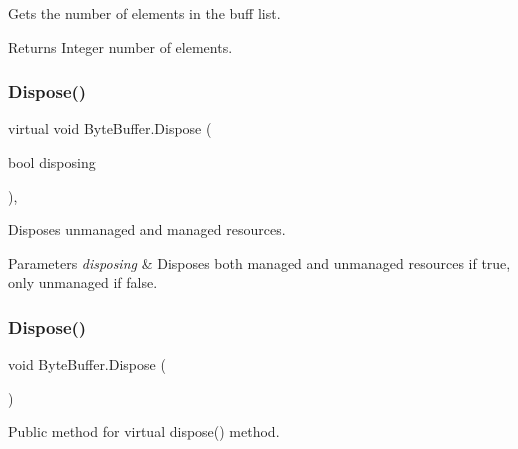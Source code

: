 Gets the number of elements in the buff list. 

\begin{DoxyReturn}{Returns}
Integer number of elements.
\end{DoxyReturn}
\mbox{\label{class_byte_buffer_aad8eb7dab24ee09d89f47c47f424e536}} 
\subsubsection{\texorpdfstring{Dispose()}{Dispose()}\hspace{0.1cm}{\footnotesize\ttfamily [1/2]}}
{\footnotesize\ttfamily virtual void Byte\+Buffer.\+Dispose (\begin{DoxyParamCaption}\item[{bool}]{disposing }\end{DoxyParamCaption})\hspace{0.3cm}{\ttfamily [protected]}, {\ttfamily [virtual]}}



Disposes unmanaged and managed resources. 


\begin{DoxyParams}{Parameters}
{\em disposing} & Disposes both managed and unmanaged resources if true, only unmanaged if false.\\
\hline
\end{DoxyParams}
\mbox{\label{class_byte_buffer_a65980af32cd7622f530cc5a30c3b23ea}} 
\subsubsection{\texorpdfstring{Dispose()}{Dispose()}\hspace{0.1cm}{\footnotesize\ttfamily [2/2]}}
{\footnotesize\ttfamily void Byte\+Buffer.\+Dispose (\begin{DoxyParamCaption}{ }\end{DoxyParamCaption})}



Public method for virtual dispose() method. 

\mbox{\label{class_byte_buffer_ad73900a2c6d3ee2efcc6d07f66340497}} 
